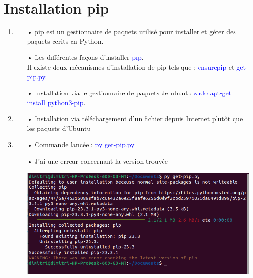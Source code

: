\documentclass[10pt,a4paper]{article}
\begin{document}
\section{Installation pip }
\begin{enumerate}
\item
\begin{itemize}
\item[]
\item[•] pip est un gestionnaire de paquets utilisé pour installer et gérer des paquets écrits en Python.
\item[•] Les différentes façons d'installer \textcolor{blue}{pip}.\\ Il existe deux mécanismes d'installation de pip tels que : \textcolor{blue}{ensurepip} et \textcolor{blue}{get-pip.py}.
\item[•] Installation via le gestionnaire de paquets de ubuntu \textcolor{blue}{sudo apt-get install python3-pip}.
\end{itemize}
\item
\begin{itemize}
\item[]
\item[•]Installation via téléchargement d'un fichier depuis Internet plutôt que les paquets d'Ubuntu
\end{itemize}

\item
\begin{itemize}
\item[]
\item[•]Commande lancée : \textcolor{blue}{py get-pip.py}
\item[•]J'ai une erreur concernant la version trouvée\\

\begin{center}
\includegraphics[scale=0.5]{2.png}\\
\end{center}
\end{itemize}


\end{enumerate}
\end{document}
